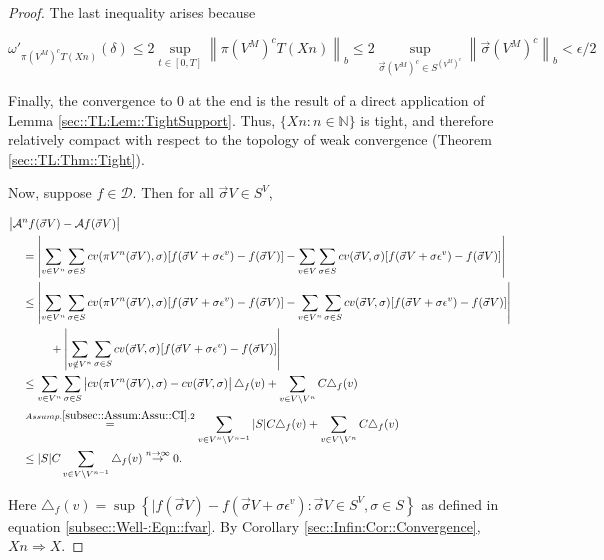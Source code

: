 \documentclass[12pt]{article}
\newcommand{\mb}{\mathbb}
\newcommand{\mc}{\mathcal}
\newcommand{\ra}{\rightarrow}
\newcommand{\os}{\overset}
\newcommand{\ep}{\epsilon}
\newcommand{\ind}{\hspace{24pt}}
\renewcommand{\v}{v}							%
\renewcommand{\S}{S}							%
\newcommand{\s}{\sigma}							%
\newcommand{\sv}{\vec{\s}}						%
\renewcommand{\b}{b}							%
\newcommand{\ev}[1]{\ep^{#1}}					%
\newcommand{\T}{T}								%
\renewcommand{\t}{t}							%
\newcommand{\proj}{\pi}							%
\newcommand{\X}{X}								%
\newcommand{\IG}{\mc{A}}						%
\newcommand{\IGr}{c}							%
\newcommand{\pup}[1]{^{#1}}							%
\newcommand{\core}{\mc{D}}							%
\newcommand{\numb}{n}								%
\newcommand{\XState}[1]{\S^{#1}}				%
\newcommand{\const}[1]{C_{#1}}						%
\begin{document}
\begin{proof}
The last inequality arises because

\[\omega'_{\proj{\left( V\pup{M}\right)^c}{\T}(\X{}{}{\numb})}(\delta) \leq 2 \sup_{\t\in [0,\T]} \left\|\proj{\left( V\pup{M}\right)^c}{\T}(\X{}{}{\numb})\right\|_{\b{}} \leq 2 \sup_{\sv{}{\left( V\pup{M}\right)^c} \in \S^{\left( V\pup{M}\right)^c}} \left\|\sv{}{\left( V\pup{M}\right)^c}\right\|_{\b{}} < \ep/2\]

Finally, the convergence to 0 at the end is the result of a direct application of Lemma \ref{sec::TL:Lem::TightSupport}. Thus, \(\{\X{}{}{\numb}:\numb\in \mb{N}\}\) is tight, and therefore relatively compact with respect to the topology of weak convergence (Theorem \ref{sec::TL:Thm::Tight}).

Now, suppose \(f\in \core\). Then for all \(\sv{}{ V} \in \S^ V\),

\begin{align*}
\big|\IG&\pup{\numb}f(\sv{}{ V}) - \IG f(\sv{}{ V})\big|\\
&= \left|\sum_{\v \in  V\pup{\numb}} \sum_{\s \in \S} \IGr{\v}(\proj{ V\pup{\numb}}{}(\sv{}{ V}),\s)[f(\sv{}{ V}+\s\ev{\v}) - f(\sv{}{ V})] - \sum_{\v \in  V}\sum_{\s \in \S} \IGr{\v}(\sv{}{ V},\s)[f(\sv{}{ V}+\s\ev{\v}) - f(\sv{}{ V})]\right|\\
&\leq  \left|\sum_{\v \in  V\pup{\numb}} \sum_{\s \in \S} \IGr{\v}(\proj{ V\pup{\numb}}{}(\sv{}{ V}),\s)[f(\sv{}{ V}+\s\ev{\v}) - f(\sv{}{ V})] - \sum_{\v \in  V\pup{\numb}}\sum_{\s \in \S} \IGr{\v}(\sv{}{ V},\s)[f(\sv{}{ V}+\s\ev{\v}) - f(\sv{}{ V})]\right|\\
&\ind  +\left|\sum_{\v \notin  V\pup{\numb}} \sum_{\s\in \S} \IGr{\v}(\sv{}{ V},\s)[f(\sv{}{ V}+\s\ev{\v}) - f(\sv{}{ V})]\right|\\
&\leq \sum_{\v \in  V\pup{\numb}}\sum_{\s \in \S} \left|\IGr{\v}(\proj{ V\pup{\numb}}{}(\sv{}{ V}),\s) - \IGr{\v}(\sv{}{ V},\s)\right|\triangle_f(\v) + \sum_{\v \in  V\setminus  V\pup{\numb}} \const{}\triangle_f(\v)\\
&\os{Assump. \ref{subsec::Assum:Assu::CI}.2}{=} \sum_{\v \in  V\pup{\numb}\setminus V\pup{\numb-1}} |\S|\const{} \triangle_f(\v) + \sum_{\v \in  V\setminus  V\pup{\numb}} \const{}\triangle_f(\v)\\
&\leq |\S|C\sum_{\v \in  V\setminus  V\pup{\numb-1}} \triangle_f(\v) \os{n\ra\infty}{\ra} 0.
\end{align*}

Here \(\triangle_f(\v) = \sup\left\{|f(\sv{}{ V}) - f(\sv{}{ V} + \s\ev{\v}): \sv{}{ V}\in \S^ V,\s \in \S\right\}\) as defined in equation \eqref{subsec::Well-:Eqn::fvar}. By Corollary \ref{sec::Infin:Cor::Convergence}, \(\X{}{}{\numb}\Rightarrow \X{}{}\).
\end{proof}
\end{document}
